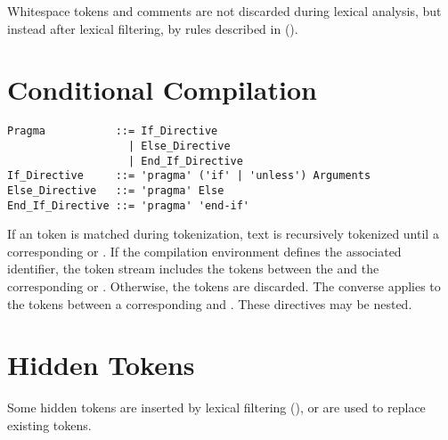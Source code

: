 Whitespace tokens and comments are not discarded during lexical analysis, but instead after lexical filtering, by rules described in ().





\section{Conditional Compilation}
\label{sec:conditional-compilation}

\grammar\begin{lstlisting}[deletekeywords={if,unless}]
Pragma           ::= If_Directive 
                   | Else_Directive 
                   | End_If_Directive 
If_Directive     ::= 'pragma' ('if' | 'unless') Arguments
Else_Directive   ::= 'pragma' Else
End_If_Directive ::= 'pragma' 'end-if'
\end{lstlisting}

If an  token is matched during tokenization, text is recursively tokenized until a corresponding  or . If the compilation environment defines the associated identifier, the token stream includes the tokens between the  and the corresponding  or . Otherwise, the tokens are discarded. The converse applies to the tokens between a corresponding  and . These directives may be nested. 





\section{Hidden Tokens}
\label{sec:hidden-tokens}

Some hidden tokens are inserted by lexical filtering (), or are used to replace existing tokens. 





